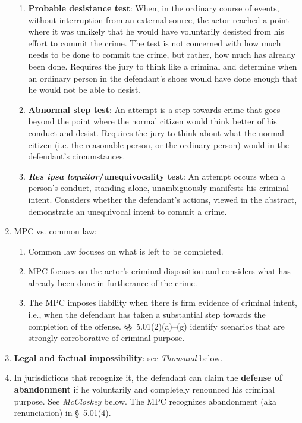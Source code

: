 \begin{enumerate}
\begin{enumerate}
        \item \textbf{Probable desistance test}: When, in the ordinary course 
        of events, without interruption from an external source, the actor 
        reached a point where it was unlikely that he would have voluntarily 
        desisted from his effort to commit the crime. The test is not 
        concerned with how much needs to be done to commit the crime, but 
        rather, how much has already been done. Requires the jury to think 
        like a criminal and determine when an ordinary person in the 
        defendant's shoes would have done enough that he would not be able to 
        desist.
        \item \textbf{Abnormal step test}: An attempt is a step towards crime 
        that goes beyond the point where the normal citizen would think better 
        of his conduct and desist.  Requires the jury to think about what the 
        normal citizen (i.e. the reasonable person, or the ordinary person) 
        would in the defendant's circumstances.
        \item \textbf{\emph{Res ipsa loquitor}/unequivocality test}:  An 
        attempt occurs when a person's conduct, standing alone, unambiguously 
        manifests his criminal intent.  Considers whether the defendant's 
        actions, viewed in the abstract, demonstrate an unequivocal intent to 
        commit a crime.
    \end{enumerate}
    \item MPC vs. common law:
    \begin{enumerate}
        \item Common law focuses on what is left to be completed.
        \item MPC focuses on the actor's criminal disposition and considers 
        what has already been done in furtherance of the crime.
        \item The MPC imposes liability when there is firm evidence of 
        criminal intent, i.e., when the defendant has taken a substantial step 
        towards the completion of the offense. \S\S\ 5.01(2)(a)--(g) identify 
        scenarios that are strongly corroborative of criminal purpose.
    \end{enumerate}
    \item \textbf{Legal and factual impossibility}: see \emph{Thousand} below.
    \item In jurisdictions that recognize it, the defendant can claim the 
    \textbf{defense of abandonment} if he voluntarily and completely renounced 
    his criminal purpose. See \emph{McCloskey} below. The MPC recognizes 
    abandonment (aka renunciation) in \S\ 5.01(4).
\end{enumerate}

